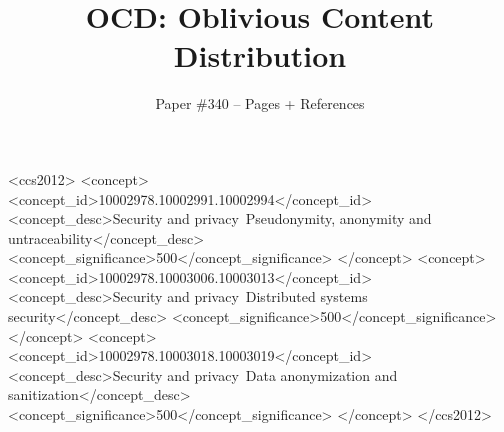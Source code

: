 \documentclass[sigconf]{acmart}
\begin{document}
\date{}
\title{OCD: Oblivious Content Distribution}
\author{
{Paper \#340 -- \pageref{lastpage} Pages + References} \\
}





\begin{CCSXML}
<ccs2012>
<concept>
<concept_id>10002978.10002991.10002994</concept_id>
<concept_desc>Security and privacy~Pseudonymity, anonymity and untraceability</concept_desc>
<concept_significance>500</concept_significance>
</concept>
<concept>
<concept_id>10002978.10003006.10003013</concept_id>
<concept_desc>Security and privacy~Distributed systems security</concept_desc>
<concept_significance>500</concept_significance>
</concept>
<concept>
<concept_id>10002978.10003018.10003019</concept_id>
<concept_desc>Security and privacy~Data anonymization and sanitization</concept_desc>
<concept_significance>500</concept_significance>
</concept>
</ccs2012>
\end{CCSXML}




\maketitle










\label{lastpage} 


\balance 
\end{document}
